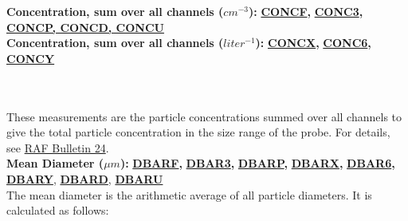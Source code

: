 \begin{hangparagraphs}
\textbf{}%
\begin{minipage}[t]{1\columnwidth}%
\textbf{Concentration, sum over all channels ($cm^{-3}$): }\textbf{\uline{CONCF}}\textbf{,
}\textbf{\uline{CONC3}}\textbf{,
}\textbf{\uline{CONCP, CONCD,
CONCU}}\\
\textbf{Concentration, sum over all channels ($liter^{-1}$): }\textbf{\uline{CONCX}}\textbf{,
}\textbf{\uline{CONC6}}\textbf{,
}\textbf{\uline{CONCY}}%
\end{minipage}\textbf{}\\
\textbf{}\\
These measurements are the particle concentrations
summed over all channels to give the total particle concentration
in the size range of the probe. For details, see \href{http://www.eol.ucar.edu/raf/Bulletins/bulletin24.html}{RAF Bulletin 24}.\\


\textbf{Mean Diameter ($\mu m$): }\textbf{\uline{DBARF}}\textbf{,
}\textbf{\uline{DBAR3}}\textbf{, }\textbf{\uline{DBARP}}\textbf{,
}\textbf{\uline{DBARX}}\textbf{, }\textbf{\uline{DBAR6}}\textbf{,
}\textbf{\uline{DBARY}}, \textbf{\uline{DBARD}},
\textbf{\uline{DBARU}}\\
The mean diameter
is the arithmetic average of all particle diameters. It is calculated
as follows: \\
\\
\end{hangparagraphs}
